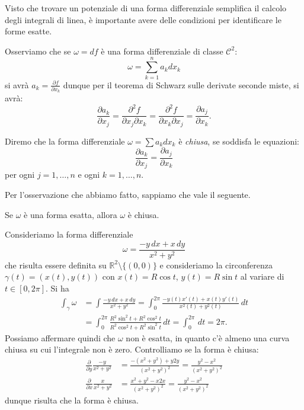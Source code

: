 \documentclass[italian,a4paper]{scrartcl}
\newcommand{\RR}{{\mathbb R}}
\begin{document}
Visto che trovare un potenziale di una forma differenziale semplifica
il calcolo degli integrali di linea, è importante avere delle
condizioni per identificare le forme esatte.

Osserviamo che se $\omega = df$ è una forma differenziale di classe
$\mathcal C^2$: 
\[
 \omega = \sum_{k=1}^n a_k dx_k
\]
si avrà $a_k = \frac{\partial f}{\partial x_k}$ dunque per il teorema
di Schwarz sulle derivate seconde miste, si avrà:
\[
 \frac{\partial a_k}{\partial x_j} = \frac{\partial^2 f}{\partial x_j
   \partial x_k} = \frac{\partial^2 f}{\partial x_k \partial x_j}
=\frac{\partial a_j}{\partial x_k}.
\]

Diremo che la forma differenziale $\omega = \sum a_k dx_k$ è
\emph{chiusa}, se soddisfa le equazioni:
\[
  \frac{\partial a_k}{\partial x_j} = \frac{\partial a_j}{\partial
    x_k}
\]
per ogni $j=1,\dots, n$ e ogni $k=1,\dots,n$.

Per l'osservazione che abbiamo fatto, sappiamo che vale il seguente.
\begin{theorem}
Se $\omega$ è una forma esatta, allora $\omega$ è chiusa.
\end{theorem}

\begin{example}
\label{ex:forma_chiusa_non_esatta}
Consideriamo la forma differenziale 
\begin{equation}\label{eq:forma_chiusa_non_esatta}
\omega = \frac{-y\, dx + x\,
  dy}{x^2+y^2}
\end{equation}
che risulta essere definita su $\RR^2 \setminus \{(0,0)\}$ e consideriamo
la circonferenza $\gamma(t)=(x(t),y(t))$ con $x(t) = R \cos t$, $y(t)=R
\sin t$ al variare di $t\in [0,2\pi]$.
Si ha
\begin{align*}
\int_\gamma \omega & = \int \frac{-y\, dx + x\, dy}{x^2+y^2}
=\int_0^{2\pi} \frac{-y(t) x'(t) + x(t) y'(t)}{x^2(t)+y^2(t)}\, dt\\
&=\int_0^{2\pi} \frac{R^2 \sin^2 t + R^2 \cos^2 t}{R^2\cos^2 t +
  R^2\sin^2 t}\, dt = \int_0^{2\pi}\, dt = 2\pi.
\end{align*}
Possiamo affermare quindi che $\omega$ non è esatta, in quanto
c'è almeno una curva chiusa su cui l'integrale non è zero. 
Controlliamo se la forma è
chiusa:
\begin{align*}
\frac{\partial}{\partial y}\frac{-y}{x^2+y^2} 
& = \frac{-(x^2+y^2)+y2y}{(x^2+y^2)^2}
= \frac{y^2 - x^2}{(x^2+y^2)^2}\\
\frac{\partial}{\partial x}\frac{x}{x^2+y^2} 
& = \frac{x^2+y^2-x2x}{(x^2+y^2)^2}
= \frac{y^2 - x^2}{(x^2+y^2)^2}
\end{align*}
dunque risulta che la forma è chiusa.
\end{example}
\end{document}
